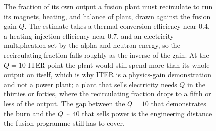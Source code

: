 \begin{figure}[htbp]
\centering
{}
\caption[Recirculating power against fusion gain]{The fraction of its own
output a fusion plant must recirculate to run its magnets, heating, and
balance of plant, drawn against the fusion gain $Q$. The estimate takes a
thermal-conversion efficiency near $0.4$, a heating-injection efficiency near
$0.7$, and an electricity multiplication set by the alpha and neutron energy,
so the recirculating fraction falls roughly as the inverse of the gain. At the
$Q=10$ ITER point the plant would still spend more than its whole output on
itself, which is why ITER is a physics-gain demonstration and not a power
plant; a plant that sells electricity needs $Q$ in the thirties or forties,
where the recirculating fraction drops to a fifth or less of the output. The
gap between the $Q=10$ that demonstrates the burn and the $Q\sim 40$ that
sells power is the engineering distance the fusion programme still has to
cover.}
\label{fig:vol04ch13:fusion-gain}
\end{figure}

